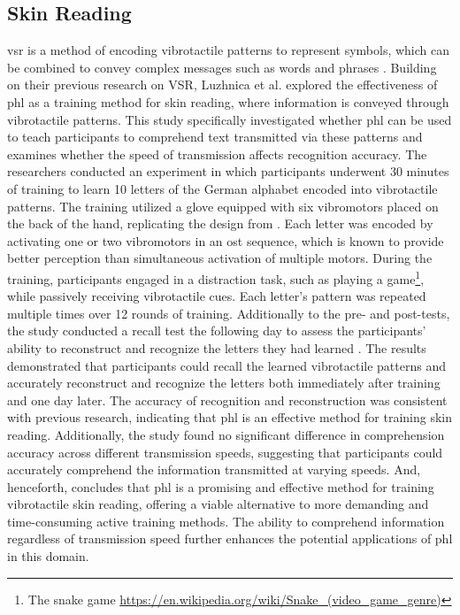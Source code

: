 \subsection{Skin Reading}

\Gls{vsr} \cite{Luzhnica2016} is a method of encoding vibrotactile patterns to represent symbols, which can be combined to convey complex messages such as words and phrases \cite{Luzhnica2018}. Building on their previous research on VSR, Luzhnica et al. \cite{Luzhnica2018} explored the effectiveness of \gls{phl} as a training method for skin reading, where information is conveyed through vibrotactile patterns. This study specifically investigated whether \gls{phl} can be used to teach participants to comprehend text transmitted via these patterns and examines whether the speed of transmission affects recognition accuracy.
The researchers conducted an experiment in which participants underwent 30 minutes of training to learn 10 letters of the German alphabet encoded into vibrotactile patterns. The training utilized a glove equipped with six vibromotors placed on the back of the hand, replicating the design from \cite{Luzhnica2016}. Each letter was encoded by activating one or two vibromotors in an \gls{ost} sequence, which is known to provide better perception than simultaneous activation of multiple motors.
During the training, participants engaged in a distraction task, such as playing a game\footnote{The snake game \url{https://en.wikipedia.org/wiki/Snake_(video_game_genre)}}, while passively receiving vibrotactile cues. Each letter's pattern was repeated multiple times over 12 rounds of training. Additionally to the pre- and post-tests, the study conducted a recall test the following day to assess the participants' ability to reconstruct and recognize the letters they had learned \cite{Luzhnica2018}.
The results demonstrated that participants could recall the learned vibrotactile patterns and accurately reconstruct and recognize the letters both immediately after training and one day later. The accuracy of recognition and reconstruction was consistent with previous research, indicating that \gls{phl} is an effective method for training skin reading. Additionally, the study found no significant difference in comprehension accuracy across different transmission speeds, suggesting that participants could accurately comprehend the information transmitted at varying speeds.
And, henceforth, concludes that \gls{phl} is a promising and effective method for training vibrotactile skin reading, offering a viable alternative to more demanding and time-consuming active training methods. The ability to comprehend information regardless of transmission speed further enhances the potential applications of \gls{phl} in this domain.


